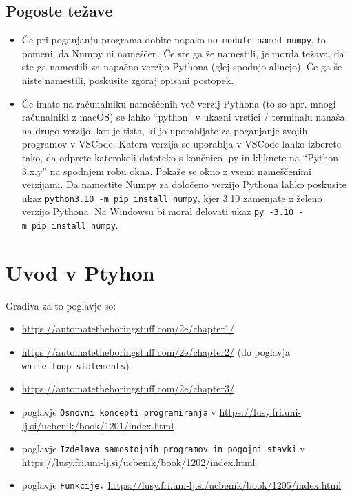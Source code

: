 \documentclass[
]{report}
\providecommand{\tightlist}{%
  \setlength{\itemsep}{0pt}\setlength{\parskip}{0pt}}
\begin{document}
\hypertarget{pogoste-teux17eave}{%
\section{Pogoste težave}\label{pogoste-teux17eave}}

\begin{itemize}
\item
  Če pri poganjanju programa dobite napako \texttt{no\ module\ named\ numpy}, to pomeni, da Numpy ni nameščen. Če ste ga že namestili, je morda težava, da ste ga namestili za napačno verzijo Pythona (glej spodnjo alinejo). Če ga še niste namestili, poskusite zgoraj opisani postopek.
\item
  Če imate na računalniku nameščenih več verzij Pythona (to so npr. mnogi računalniki z macOS) se lahko ``python'' v ukazni vrstici / terminalu nanaša na drugo verzijo, kot je tista, ki jo uporabljate za poganjanje svojih programov v VSCode. Katera verzija se uporablja v VSCode lahko izberete tako, da odprete katerokoli datoteko s končnico .py in kliknete na ``Python 3.x.y'' na spodnjem robu okna. Pokaže se okno z vsemi nameščenimi verzijami. Da namestite Numpy za določeno verzijo Pythona lahko poskusite ukaz \texttt{python3.10\ -m\ pip\ install\ numpy}, kjer 3.10 zamenjate z želeno verzijo Pythona. Na Windowsu bi moral delovati ukaz \texttt{py\ -3.10\ -m\ pip\ install\ numpy}.
\end{itemize}

\hypertarget{uvod-v-ptyhon}{%
\chapter{Uvod v Ptyhon}\label{uvod-v-ptyhon}}

Gradiva za to poglavje so:

\begin{itemize}
\tightlist
\item
  \url{https://automatetheboringstuff.com/2e/chapter1/}
\item
  \url{https://automatetheboringstuff.com/2e/chapter2/} (do poglavja \texttt{while\ loop\ statements})
\item
  \url{https://automatetheboringstuff.com/2e/chapter3/}
\item
  poglavje \texttt{Osnovni\ koncepti\ programiranja} v \url{https://lusy.fri.uni-lj.si/ucbenik/book/1201/index.html}
\item
  poglavje \texttt{Izdelava\ samostojnih\ programov\ in\ pogojni\ stavki} v \url{https://lusy.fri.uni-lj.si/ucbenik/book/1202/index.html}
\item
  poglavje \texttt{Funkcije}v \url{https://lusy.fri.uni-lj.si/ucbenik/book/1205/index.html}
\end{itemize}
\end{document}
